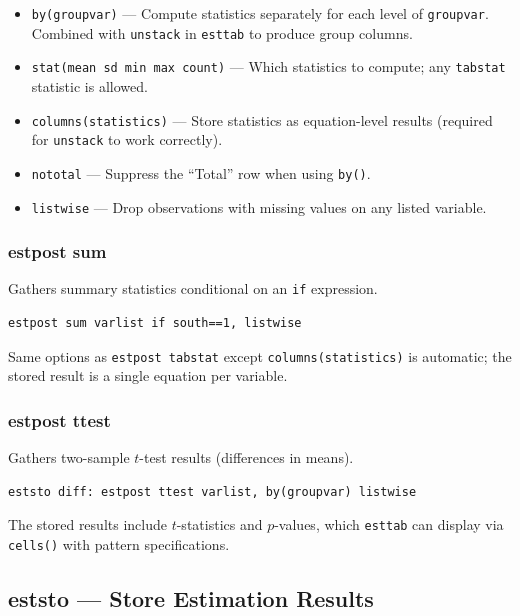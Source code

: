 \documentclass[11pt]{article}
\numberwithin{table}{section}
\begin{document}
\begin{itemize}
    \item \texttt{by(groupvar)} --- Compute statistics separately for each level of \texttt{groupvar}. Combined with \texttt{unstack} in \texttt{esttab} to produce group columns.
    \item \texttt{stat(mean sd min max count)} --- Which statistics to compute; any \texttt{tabstat} statistic is allowed.
    \item \texttt{columns(statistics)} --- Store statistics as equation-level results (required for \texttt{unstack} to work correctly).
    \item \texttt{nototal} --- Suppress the ``Total'' row when using \texttt{by()}.
    \item \texttt{listwise} --- Drop observations with missing values on any listed variable.
\end{itemize}

\subsubsection{estpost sum}
Gathers summary statistics conditional on an \texttt{if} expression.

\begin{lstlisting}[style=stata]
estpost sum varlist if south==1, listwise
\end{lstlisting}

Same options as \texttt{estpost tabstat} except \texttt{columns(statistics)} is automatic; the stored result is a single equation per variable.

\subsubsection{estpost ttest}
Gathers two-sample $t$-test results (differences in means).

\begin{lstlisting}[style=stata]
eststo diff: estpost ttest varlist, by(groupvar) listwise
\end{lstlisting}

The stored results include $t$-statistics and $p$-values, which \texttt{esttab} can display via \texttt{cells()} with pattern specifications.

\subsection{eststo --- Store Estimation Results}
\end{document}
